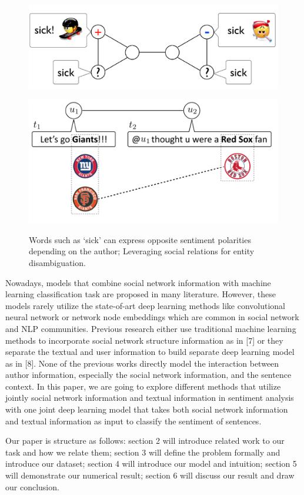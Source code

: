 \begin{figure}[h]
\centering
\begin{minipage}{.5\textwidth}
  \centering
  \includegraphics[width=1\linewidth]{sick}
    \label{fig:test1}
\end{minipage}%
\begin{minipage}{.5\textwidth}
  \centering
  \includegraphics[width=1\linewidth]{Giant}
  
  \label{fig:test2}
\end{minipage}
\caption{Words such as ‘sick’ can express opposite sentiment
polarities depending on the author; Leveraging social relations for entity
disambiguation.}
\end{figure}


Nowadays, models that combine social network information with machine learning classification task are proposed in many literature. However, these models rarely utilize the state-of-art deep learning methods like convolutional neural network or network node embeddings which are common in social network and NLP communities. Previous research either use traditional machine learning methods to incorporate social network structure information as in [7] or they separate the textual and user information to build separate deep learning model as in [8]. None of the previous works directly model the interaction between author information, especially the social network information, and the sentence context. In this paper, we are going to explore different methods that utilize jointly social network information and textual information in sentiment analysis with one joint deep learning model that takes both social network information and textual information as input to classify the sentiment of sentences.

Our paper is structure as follows: section 2 will introduce related work to our task and how we relate them; section 3 will define the problem formally and introduce our dataset; section 4 will introduce our model and intuition; section 5 will demonstrate our numerical result; section 6 will discuss our result and draw our conclusion.
